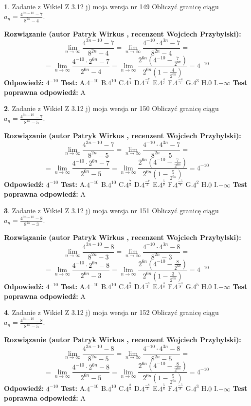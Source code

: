\documentclass[12pt, a4paper]{article}
\theoremstyle{definition} %
\newtheorem{zad}{}
\newcommand{\zadStart}[1]{\begin{zad}#1\newline}
\newcommand{\zadStop}{\end{zad}}
\newcommand{\rozwStart}[2]{\noindent \textbf{Rozwiązanie (autor #1 , recenzent #2): }\newline}
\newcommand{\rozwStop}{\newline}
\newcommand{\odpStart}{\noindent \textbf{Odpowiedź:}\newline}
\newcommand{\odpStop}{\newline}
\newcommand{\testStart}{\noindent \textbf{Test:}\newline}
\newcommand{\testStop}{\newline}
\newcommand{\kluczStart}{\noindent \textbf{Test poprawna odpowiedź:}\newline}
\newcommand{\kluczStop}{\newline}
\begin{document}
\zadStart{Zadanie z Wikieł Z 3.12 j) moja wersja nr 149}
Obliczyć granicę ciągu $a_{n}=\frac{4^{3n-10}-7}{8^{2n}-4}$.
\zadStop
\rozwStart{Patryk Wirkus}{Wojciech Przybylski}
$$\lim\limits_{n\to\infty}\frac{4^{3n-10}-7}{8^{2n}-4}= \lim\limits_{n\to\infty}\frac{4^{-10} \cdot 4^{3n}-7}{8^{2n}-4}=$$
$$= \lim\limits_{n\to\infty}\frac{4^{-10} \cdot 2^{6n}-7}{2^{6n}-4}= \lim\limits_{n\to\infty}\frac{2^{6n}(4^{-10} - \frac{7}{2^{6n}})}{2^{6n}(1-\frac{4}{2^{6n}})}= 4^{-10}$$
\rozwStop
\odpStart
$4^{-10}$
\odpStop
\testStart
A.$4^{-10}$
B.$4^{10}$
C.$4^{\frac{7}{4}}$
D.$4^{\frac{-7}{4}}$
E.$4^{\frac{4}{7}}$
F.$4^{\frac{-4}{7}}$
G.$4^{3}$
H.$0$
I.$-\infty$
\testStop
\kluczStart
A
\kluczStop



\zadStart{Zadanie z Wikieł Z 3.12 j) moja wersja nr 150}
Obliczyć granicę ciągu $a_{n}=\frac{4^{3n-10}-7}{8^{2n}-5}$.
\zadStop
\rozwStart{Patryk Wirkus}{Wojciech Przybylski}
$$\lim\limits_{n\to\infty}\frac{4^{3n-10}-7}{8^{2n}-5}= \lim\limits_{n\to\infty}\frac{4^{-10} \cdot 4^{3n}-7}{8^{2n}-5}=$$
$$= \lim\limits_{n\to\infty}\frac{4^{-10} \cdot 2^{6n}-7}{2^{6n}-5}= \lim\limits_{n\to\infty}\frac{2^{6n}(4^{-10} - \frac{7}{2^{6n}})}{2^{6n}(1-\frac{5}{2^{6n}})}= 4^{-10}$$
\rozwStop
\odpStart
$4^{-10}$
\odpStop
\testStart
A.$4^{-10}$
B.$4^{10}$
C.$4^{\frac{7}{5}}$
D.$4^{\frac{-7}{5}}$
E.$4^{\frac{5}{7}}$
F.$4^{\frac{-5}{7}}$
G.$4^{2}$
H.$0$
I.$-\infty$
\testStop
\kluczStart
A
\kluczStop



\zadStart{Zadanie z Wikieł Z 3.12 j) moja wersja nr 151}
Obliczyć granicę ciągu $a_{n}=\frac{4^{3n-10}-8}{8^{2n}-3}$.
\zadStop
\rozwStart{Patryk Wirkus}{Wojciech Przybylski}
$$\lim\limits_{n\to\infty}\frac{4^{3n-10}-8}{8^{2n}-3}= \lim\limits_{n\to\infty}\frac{4^{-10} \cdot 4^{3n}-8}{8^{2n}-3}=$$
$$= \lim\limits_{n\to\infty}\frac{4^{-10} \cdot 2^{6n}-8}{2^{6n}-3}= \lim\limits_{n\to\infty}\frac{2^{6n}(4^{-10} - \frac{8}{2^{6n}})}{2^{6n}(1-\frac{3}{2^{6n}})}= 4^{-10}$$
\rozwStop
\odpStart
$4^{-10}$
\odpStop
\testStart
A.$4^{-10}$
B.$4^{10}$
C.$4^{\frac{8}{3}}$
D.$4^{\frac{-8}{3}}$
E.$4^{\frac{3}{8}}$
F.$4^{\frac{-3}{8}}$
G.$4^{5}$
H.$0$
I.$-\infty$
\testStop
\kluczStart
A
\kluczStop



\zadStart{Zadanie z Wikieł Z 3.12 j) moja wersja nr 152}
Obliczyć granicę ciągu $a_{n}=\frac{4^{3n-10}-8}{8^{2n}-5}$.
\zadStop
\rozwStart{Patryk Wirkus}{Wojciech Przybylski}
$$\lim\limits_{n\to\infty}\frac{4^{3n-10}-8}{8^{2n}-5}= \lim\limits_{n\to\infty}\frac{4^{-10} \cdot 4^{3n}-8}{8^{2n}-5}=$$
$$= \lim\limits_{n\to\infty}\frac{4^{-10} \cdot 2^{6n}-8}{2^{6n}-5}= \lim\limits_{n\to\infty}\frac{2^{6n}(4^{-10} - \frac{8}{2^{6n}})}{2^{6n}(1-\frac{5}{2^{6n}})}= 4^{-10}$$
\rozwStop
\odpStart
$4^{-10}$
\odpStop
\testStart
A.$4^{-10}$
B.$4^{10}$
C.$4^{\frac{8}{5}}$
D.$4^{\frac{-8}{5}}$
E.$4^{\frac{5}{8}}$
F.$4^{\frac{-5}{8}}$
G.$4^{3}$
H.$0$
I.$-\infty$
\testStop
\kluczStart
A
\kluczStop
\end{document}
